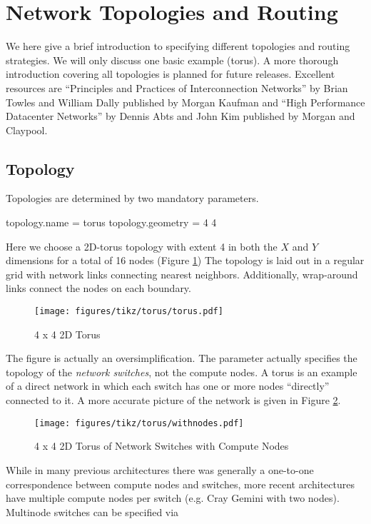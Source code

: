 
\section{Network Topologies and Routing}
\label{sec:tutorial:topology}
We here give a brief introduction to specifying different topologies and routing strategies.  
We will only discuss one basic example (torus).  
A more thorough introduction covering all topologies is planned for future releases.
Excellent resources are ``Principles and Practices of Interconnection Networks'' by Brian Towles and William Dally published by Morgan Kaufman and ``High Performance Datacenter Networks'' by Dennis Abts and John Kim published by Morgan and Claypool.

\subsection{Topology}
\label{subsec:tutorial:topology}

Topologies are determined by two mandatory parameters.
\begin{ViFile}
topology.name = torus
topology.geometry = 4 4
\end{ViFile}
Here we choose a 2D-torus topology with extent 4 in both the $X$ and $Y$ dimensions for a total of 16 nodes (Figure \ref{fig:hdtorus:basic})
The topology is laid out in a regular grid with network links connecting nearest neighbors.  
Additionally, wrap-around links connect the nodes on each boundary.  
\begin{figure}[h]
\centering
\texttt{[image: figures/tikz/torus/torus.pdf]}
\caption{4 x 4 2D Torus}
\label{fig:hdtorus:basic}
\end{figure}


The figure is actually an oversimplification.  
The  parameter actually specifies the topology of the \emph{network switches}, not the compute nodes. 
A torus is an example of a direct network in which each switch has one or more nodes ``directly'' connected to it.  
A more accurate picture of the network is given in Figure \ref{fig:hdtorus:withnodes}.
\begin{figure}[h]
\centering
\texttt{[image: figures/tikz/torus/withnodes.pdf]}
\caption{4 x 4 2D Torus of Network Switches with Compute Nodes}
\label{fig:hdtorus:withnodes}
\end{figure}
While in many previous architectures there was generally a one-to-one correspondence between compute nodes and switches, more recent architectures have multiple compute nodes per switch (e.g. Cray Gemini with two nodes).  
Multinode switches can be specified via

